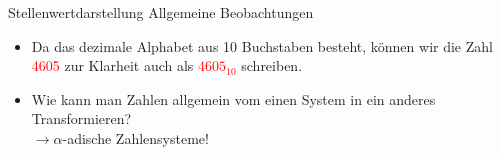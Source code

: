 \begin{frame}{Stellenwertdarstellung}
    Allgemeine Beobachtungen
    \begin{itemize}
        \item Da das dezimale Alphabet aus 10 Buchstaben besteht, können wir die Zahl \textcolor{red}{4605} zur Klarheit auch als \textcolor{red}{$4605_{10}$} schreiben.\\
        
        \item<3-> Wie kann man Zahlen allgemein vom einen System in ein anderes Transformieren?\\
        $\rightarrow \alpha$-adische Zahlensysteme!
    \end{itemize}
\end{frame}

